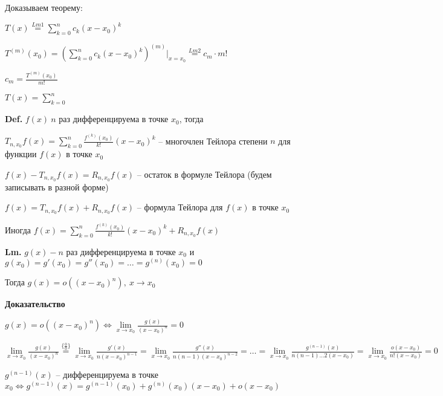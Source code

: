 \documentclass[14pt, letter paper]{article}
\begin{document}
\vspace{2mm}

Доказываем теорему:

$T(x) \stackrel{Lm 1}{=} \sum\limits_{k = 0}^n c_k (x - x_0)^k$

$T^{(m)}(x_0) = (\sum\limits_{k = 0}^n c_k(x - x_0)^k)^{(m)}|_{x = x_0} \stackrel{Lm 2}{=} c_m \cdot m!$

$c_m = \frac{T^{(m)}(x_0)}{m!}$

$T(x) = \sum\limits_{k = 0}^n$

\vspace{5mm}

\textbf{Def.} $f(x)\ n$ раз дифференцируема в точке $x_0$, тогда 

$T_{n, x_0}f(x) = \sum\limits_{k = 0}^n \frac{f^{(k)}(x_0)}{k!}(x - x_0)^k$ -- многочлен Тейлора степени $n$ для функции $f(x)$ в точке $x_0$

$f(x) - T_{n, x_0}f(x) = R_{n, x_0}f(x)$ -- остаток в формуле Тейлора (будем записывать в разной форме)

$f(x) = T_{n, x_0}f(x) + R_{n, x_0} f(x)$ -- формула Тейлора для $f(x)$ в точке $x_0$

Иногда $f(x) = \sum\limits_{k = 0}^n \frac{f^{(k)}(x_0)}{k!}(x - x_0)^k + R_{n, x_0}f(x)$

\vspace{5mm}

\textbf{Lm.} $g(x) - n$ раз дифференцируема в точке $x_0$ и $g(x_0) = g'(x_0) = g''(x_0) = \ldots = g^{(n)}(x_0) = 0$

Тогда $g(x) = o((x - x_0)^n),\ x \rightarrow x_0$

\begin{center}
    \textbf{Доказательство}
\end{center}

$g(x) = o((x - x_0)^n) \Leftrightarrow \lim\limits_{x \rightarrow x_0} \frac{g(x)}{(x - x_0)^n} = 0$

$\lim\limits_{x \rightarrow x_0} \frac{g(x)}{(x - x_0)^n} \stackrel{\{ \frac{0}{0} \}}{=} \lim\limits_{x \rightarrow x_0} \frac{g'(x)}{n(x - x_0)^{n-1}} = \lim\limits_{x \rightarrow x_0} \frac{g''(x)}{n(n-1)(x - x_0)^{n-2}} = \ldots = \lim\limits_{x \rightarrow x_0} \frac{g^{(n-1)}(x)}{n(n-1)\ldots 2(x - x_0)} = \lim\limits_{x \rightarrow x_0} \frac{o(x - x_0)}{n!(x - x_0)} = 0$

$g^{(n - 1)}(x)$ -- дифференцируема в точке $x_0 \Leftrightarrow g^{(n - 1)}(x) = g^{(n - 1)}(x_0) + g^{(n)}(x_0)(x - x_0) + o(x - x_0)$
\end{document}
